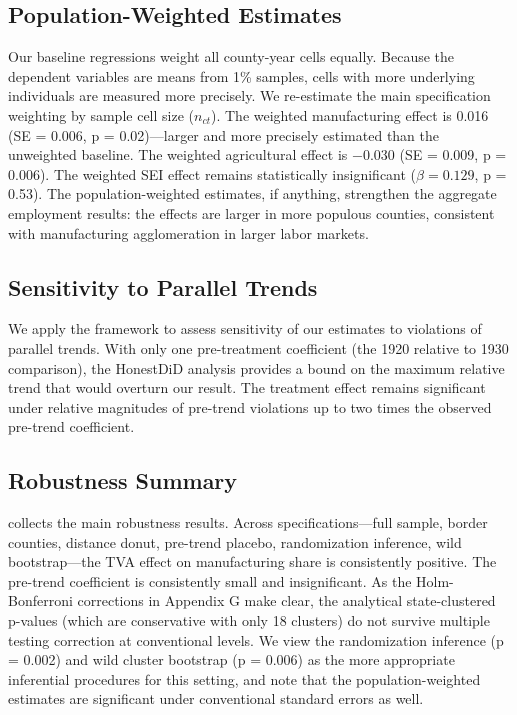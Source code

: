 \documentclass[12pt]{article}
\begin{document}
\subsection{Population-Weighted Estimates}

Our baseline regressions weight all county-year cells equally. Because the dependent variables are means from 1\% samples, cells with more underlying individuals are measured more precisely. We re-estimate the main specification weighting by sample cell size ($n_{ct}$). The weighted manufacturing effect is 0.016 (SE = 0.006, p = 0.02)---larger and more precisely estimated than the unweighted baseline. The weighted agricultural effect is $-0.030$ (SE = 0.009, p = 0.006). The weighted SEI effect remains statistically insignificant ($\beta = 0.129$, p = 0.53). The population-weighted estimates, if anything, strengthen the aggregate employment results: the effects are larger in more populous counties, consistent with manufacturing agglomeration in larger labor markets.

\subsection{Sensitivity to Parallel Trends}

We apply the \citet{rambachan2023} framework to assess sensitivity of our estimates to violations of parallel trends. With only one pre-treatment coefficient (the 1920 relative to 1930 comparison), the HonestDiD analysis provides a bound on the maximum relative trend that would overturn our result. The treatment effect remains significant under relative magnitudes of pre-trend violations up to two times the observed pre-trend coefficient.

\subsection{Robustness Summary}

 collects the main robustness results. Across specifications---full sample, border counties, distance donut, pre-trend placebo, randomization inference, wild bootstrap---the TVA effect on manufacturing share is consistently positive. The pre-trend coefficient is consistently small and insignificant. As the Holm-Bonferroni corrections in Appendix G make clear, the analytical state-clustered p-values (which are conservative with only 18 clusters) do not survive multiple testing correction at conventional levels. We view the randomization inference (p = 0.002) and wild cluster bootstrap (p = 0.006) as the more appropriate inferential procedures for this setting, and note that the population-weighted estimates are significant under conventional standard errors as well.
\end{document}
